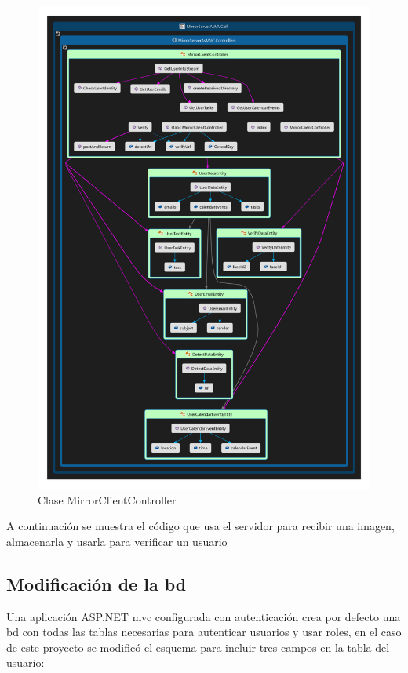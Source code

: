 \begin{figure}[!htbp]
	\centering
	\includegraphics[angle=0, scale=1.0]{fig/MirrorClientController}
	\caption{Clase MirrorClientController}
\end{figure}

A continuación se muestra el código que usa el servidor para recibir una imagen, almacenarla y usarla para verificar un usuario



\subsection{Modificación de la \acrshort{bd}}

Una aplicación ASP.NET \acrshort{mvc} configurada con autenticación crea por defecto una \acrshort{bd} con todas las tablas necesarias para autenticar usuarios y usar roles, en el caso de este proyecto se modificó el esquema para incluir tres campos en la tabla del usuario:

